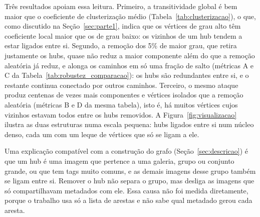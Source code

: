 Três resultados apoiam essa leitura. Primeiro, a transitividade global é bem maior que o coeficiente de clusterização médio (Tabela~\ref{tab:clusterizacao}), o que, como discutido na Seção~\ref{sec:parte1}, indica que os vértices de grau alto têm coeficiente local maior que os de grau baixo: os vizinhos de um hub tendem a estar ligados entre si. Segundo, a remoção dos 5\% de maior grau, que retira justamente os hubs, quase não reduz a maior componente além do que a remoção aleatória já reduz, e alonga os caminhos em só uma fração de salto (métricas A e C da Tabela~\ref{tab:robustez_comparacao}): os hubs são redundantes entre si, e o restante continua conectado por outros caminhos. Terceiro, o mesmo ataque produz centenas de vezes mais componentes e vértices isolados que a remoção aleatória (métricas B e D da mesma tabela), isto é, há muitos vértices cujos vizinhos estavam todos entre os hubs removidos. A Figura~\ref{fig:visualizacao} ilustra as duas estruturas numa escala pequena: hubs ligados entre si num núcleo denso, cada um com um leque de vértices que só se ligam a ele.

Uma explicação compatível com a construção do grafo (Seção~\ref{sec:descricao}) é que um hub é uma imagem que pertence a uma galeria, grupo ou conjunto grande, ou que tem tags muito comuns, e as demais imagens desse grupo também se ligam entre si. Remover o hub não separa o grupo, mas desliga as imagens que só compartilhavam metadados com ele. Essa causa não foi medida diretamente, porque o trabalho usa só a lista de arestas e não sabe qual metadado gerou cada aresta.

